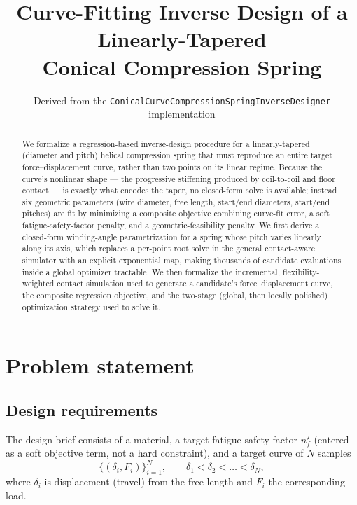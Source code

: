 \documentclass[11pt]{article}
\title{Curve-Fitting Inverse Design of a Linearly-Tapered\\
Conical Compression Spring}
\author{Derived from the \texttt{ConicalCurveCompressionSpringInverseDesigner} implementation}
\date{}
\begin{document}
\maketitle

\begin{abstract}
We formalize a regression-based inverse-design procedure for a
linearly-tapered (diameter and pitch) helical compression spring that
must reproduce an entire target force--displacement curve, rather than
two points on its linear regime. Because the curve's nonlinear shape —
the progressive stiffening produced by coil-to-coil and floor contact —
is exactly what encodes the taper, no closed-form solve is available;
instead six geometric parameters (wire diameter, free length, start/end
diameters, start/end pitches) are fit by minimizing a composite objective
combining curve-fit error, a soft fatigue-safety-factor penalty, and a
geometric-feasibility penalty. We first derive a closed-form winding-angle
parametrization for a spring whose pitch varies linearly along its axis,
which replaces a per-point root solve in the general contact-aware
simulator with an explicit exponential map, making thousands of candidate
evaluations inside a global optimizer tractable. We then formalize the
incremental, flexibility-weighted contact simulation used to generate a
candidate's force--displacement curve, the composite regression
objective, and the two-stage (global, then locally polished) optimization
strategy used to solve it.
\end{abstract}

\tableofcontents

\section{Problem statement}

\subsection{Design requirements}

The design brief consists of a material, a target fatigue safety factor
$n_f^{\star}$ (entered as a soft objective term, not a hard constraint),
and a target curve of $N$ samples
\begin{equation}
\big\{(\delta_i, F_i)\big\}_{i=1}^{N}, \qquad \delta_1 < \delta_2 < \dots < \delta_N,
\end{equation}
where $\delta_i$ is displacement (travel) from the free length and $F_i$
the corresponding load.
\end{document}
